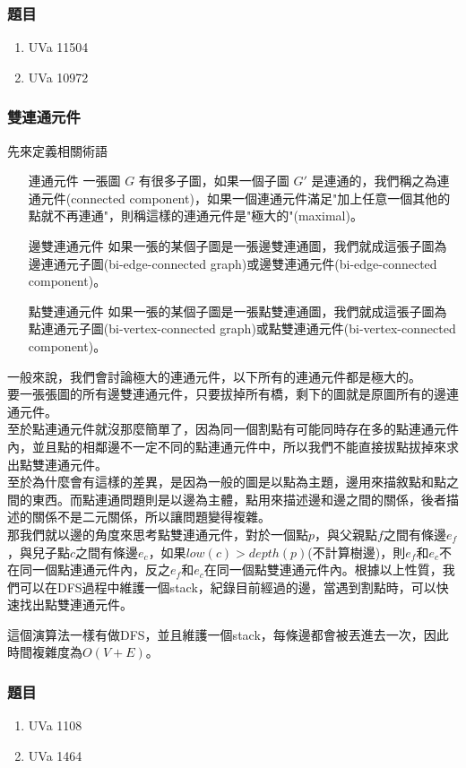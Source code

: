 \subsubsection{題目}
\begin{enumerate}
\item UVa 11504
\item UVa 10972
\end{enumerate}
\subsubsection{雙連通元件}
先來定義相關術語
\begin{enumerate}
\item [連通元件] 一張圖 $G$ 有很多子圖，如果一個子圖 $G'$ 是連通的，我們稱之為連通元件(connected component)，如果一個連通元件滿足"加上任意一個其他的點就不再連通"，則稱這樣的連通元件是"極大的"(maximal)。
\item [邊雙連通元件] 如果一張的某個子圖是一張邊雙連通圖，我們就成這張子圖為邊連通元子圖(bi-edge-connected graph)或邊雙連通元件(bi-edge-connected component)。
\item [點雙連通元件] 如果一張的某個子圖是一張點雙連通圖，我們就成這張子圖為點連通元子圖(bi-vertex-connected graph)或點雙連通元件(bi-vertex-connected component)。
\end{enumerate}
一般來說，我們會討論極大的連通元件，以下所有的連通元件都是極大的。\\
要一張張圖的所有邊雙連通元件，只要拔掉所有橋，剩下的圖就是原圖所有的邊連通元件。\\
至於點連通元件就沒那麼簡單了，因為同一個割點有可能同時存在多的點連通元件內，並且點的相鄰邊不一定不同的點連通元件中，所以我們不能直接拔點拔掉來求出點雙連通元件。\\
至於為什麼會有這樣的差異，是因為一般的圖是以點為主題，邊用來描敘點和點之間的東西。而點連通問題則是以邊為主體，點用來描述邊和邊之間的關係，後者描述的關係不是二元關係，所以讓問題變得複雜。\\
那我們就以邊的角度來思考點雙連通元件，對於一個點$p$，與父親點$f$之間有條邊$e_f$，與兒子點$c$之間有條邊$e_c$，如果$low(c)>depth(p)$(不計算樹邊)，則$e_f$和$e_c$不在同一個點連通元件內，反之$e_f$和$e_c$在同一個點雙連通元件內。根據以上性質，我們可以在DFS過程中維護一個stack，紀錄目前經過的邊，當遇到割點時，可以快速找出點雙連通元件。

這個演算法一樣有做DFS，並且維護一個stack，每條邊都會被丟進去一次，因此時間複雜度為$O(V+E)$。
\subsubsection{題目}
\begin{enumerate}
\item UVa 1108
\item UVa 1464
\end{enumerate}
